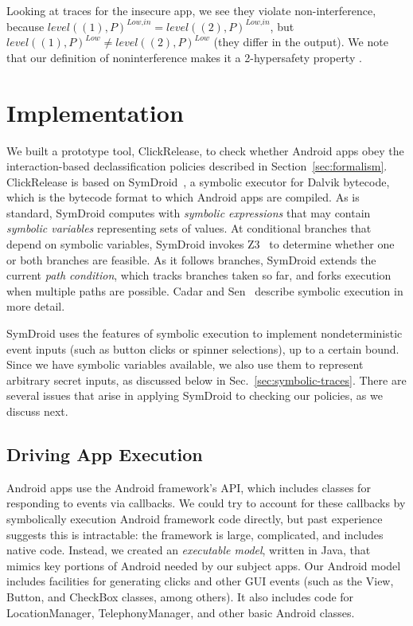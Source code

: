 \documentclass{llncs}
\newcommand{\code}[1]{\textsf{#1}} %
\newcommand{\toolname}{ClickRelease\xspace}
\newcommand{\tleveltr}[2]{\textit{level}(#1, #2)}
\begin{document}
Looking at traces for the insecure app, we see
they violate non-interference, because
$\tleveltr{(1)}{P}^\textit{Low,in} =
\tleveltr{(2)}{P}^\textit{Low,in}$, but
$\tleveltr{(1)}{P}^\textit{Low} \neq \tleveltr{(2)}{P}^\textit{Low}$
(they differ in the output).  We note that our definition of
noninterference makes it a 2-hypersafety property \cite{Clarkson:10,Clarkson:2014}.

\section{Implementation}
\label{sec:implementation}

We built a prototype tool, \toolname{}, to check whether Android apps obey the
interaction-based declassification policies described in
Section~\ref{sec:formalism}. \toolname{} is based on
SymDroid~\cite{Jeon:2012}, a symbolic executor for Dalvik bytecode,
which is the bytecode format to which Android apps are compiled.
As is standard, SymDroid computes with \emph{symbolic
  expressions} that may contain \emph{symbolic variables}
representing sets of values. At conditional branches that depend on
symbolic variables, SymDroid invokes Z3~\cite{deMoura:2008} to
determine whether one or both branches are feasible. As it follows
branches, SymDroid extends the current \emph{path condition}, which tracks
branches taken so far, and forks execution when multiple paths are
possible. Cadar and Sen~\cite{Cadar:13} describe
symbolic execution in more detail.

SymDroid uses the features of symbolic execution to implement
nondeterministic event inputs (such as button clicks or spinner
selections), up to a certain bound. Since we have symbolic variables
available, we also use them to represent arbitrary secret inputs, as
discussed below in Sec.~\ref{sec:symbolic-traces}. There are several issues that arise in applying SymDroid
to checking our policies, as we discuss next.

\subsection{Driving App Execution}
\label{sec:driver}

Android apps use the Android framework's API, which includes
classes for responding to events via callbacks. We could try to
account for these callbacks by symbolically execution Android framework code
directly, but past experience suggests this is intractable: the
framework is large, complicated, and includes native code.
Instead, we created an \emph{executable model}, written in Java, that
mimics key portions of Android needed by our subject apps. Our Android
model includes facilities for generating clicks and
other GUI events (such as the \code{View}, \code{Button}, and
\code{CheckBox} classes, among others). It also includes code for
\code{LocationManager},
\code{TelephonyManager}, and other basic Android classes.
\end{document}
